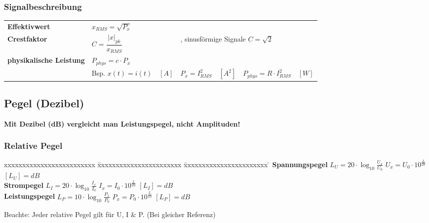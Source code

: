 		\subsubsection{Signalbeschreibung}
			\begin{tabular}{p{4cm} p{4cm} p{4cm} p{4cm}}
				\textbf{Effektivwert} & 
				$x_{RMS} = \sqrt{P_x}$\\
				\textbf{Crestfaktor} & 
				$C = \dfrac{|x|_{pk}}{x_{RMS}}$ &
				\multicolumn{2}{l}{, sinusförmige Signale $C = \sqrt{2}$}\\
				\textbf{physikalische Leistung} &
				$P_{phys} = c \cdot P_x$\\
				& Bsp. $x(t) = i(t) \quad [A]$&
				$P_x = I_{RMS}^2 \quad [A^2]$&
				$P_{phys} = R \cdot I_{RMS}^2 \quad [W]$
			\end{tabular}
			 
			

	\subsection{Pegel (Dezibel)}
		\textbf{Mit Dezibel (dB) vergleicht man Leistungspegel, nicht Amplituden!}

	\subsubsection{Relative Pegel}
		\begin{tabbing}
			xxxxxxxxxxxxxxxxxxxxxxxxx \= xxxxxxxxxxxxxxxxxxxxxxx  \= xxxxxxxxxxxxxxxxxxxxxxx \=\kill
			\textbf{Spannungspegel} \> $L_U = 20 \cdot \log_{10} \frac{U_x}{U_0}$ \> $U_x = U_0 \cdot
			10^{\frac{L}{20}} $ \> $[L_U] = dB$ \\ 
			
			\textbf{Strompegel} \> $L_I  = 20 \cdot \log_{10} \frac{I_x}{I_0}$ \> $I_x = I_0 \cdot
			10^{\frac{L}{20}} $ \> $[L_I] = dB$ \\ 
			
			\textbf{Leistungspegel} \> $L_P = 10 \cdot \log_{10} \frac{P_x}{P_0}$ \> $P_x = P_0 \cdot
			10^{\frac{L}{10}} $ \> $[L_P] = dB$
		\end{tabbing}
		Beachte: Jeder relative Pegel gilt für U, I \& P. (Bei gleicher Referenz)
	

